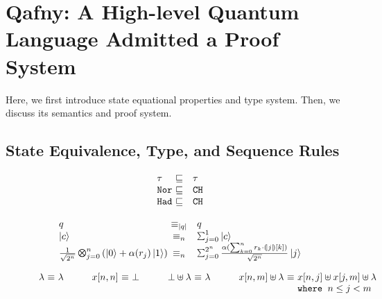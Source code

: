 \section{Qafny: A High-level Quantum Language Admitted a Proof System}
\label{sec:vqir}

Here, we first introduce \qafny state equational properties and type system. Then, we discuss its semantics and proof system.

\subsection{State Equivalence, Type, and Sequence Rules}\label{sec:state}

\begin{figure}
{\footnotesize
{\hspace*{-6em}
\begin{minipage}[t]{0.35\textwidth}
\begin{center}
 \[
  \begin{array}{l@{~}cl}
  \tau & \sqsubseteq & \tau \\
  \tnort &\sqsubseteq& \tcht\\
  \thadt &\sqsubseteq& \tcht
    \end{array}
  \]
\end{center}
  \label{fig:qafny-subtype}
\end{minipage}
\qquad
\begin{minipage}[t]{0.5\textwidth}
\begin{center}
   \[
   \begin{array}{l@{~}cl}
   q & \equiv_{\slen{q}} & q \\
  \ket{c} &\equiv_n& \sch{1}{ }{c}\\
  \shad{2^n}{n}{\alpha(r_j)} &\equiv_n& \sch{2^n}{\frac{\alpha(\sum_{k=0}^{n} r_k \cdot \tos{j}[k])}{\sqrt{2^n}}}{j}
    \end{array}
 \]
\end{center}
  \label{fig:qafny-sequiv}
\end{minipage}
\hfill{}
\begin{minipage}[t]{0.8\textwidth}
\begin{center}
 \[
  \begin{array}{l @{~} c @{~} l l@{~}c @{~} l l @{~}c @{~} l l @ {~} c @{~} l}
\lambda &\equiv & \lambda
&
\qquad
x[n,n] & \equiv & \bot
&
\qquad
\bot \uplus \lambda & \equiv & \lambda
&
\qquad
x[n,m]\uplus\lambda & \equiv & x[n,j]\uplus x[j,m] \uplus\lambda
\\
&&&&&&&&&&&
\texttt{where}\;\;n \le j < m


\end{array}\]
\end{center}
\end{minipage}}}
\end{figure}
